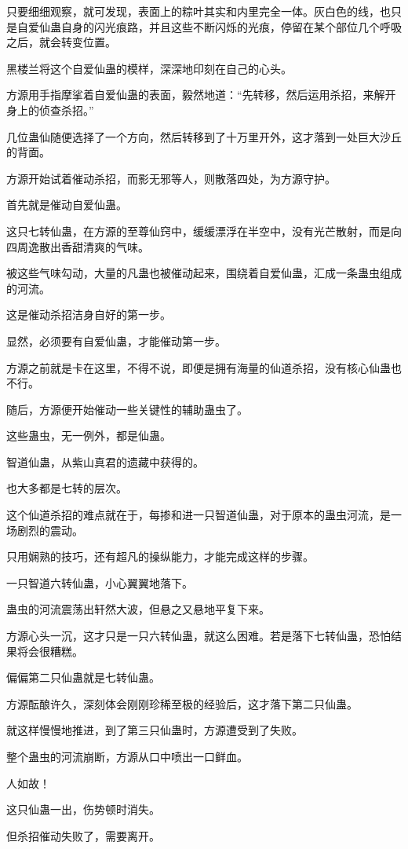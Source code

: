 \begin{this_body}
只要细细观察，就可发现，表面上的粽叶其实和内里完全一体。灰白色的线，也只是自爱仙蛊自身的闪光痕路，并且这些不断闪烁的光痕，停留在某个部位几个呼吸之后，就会转变位置。

黑楼兰将这个自爱仙蛊的模样，深深地印刻在自己的心头。

方源用手指摩挲着自爱仙蛊的表面，毅然地道：“先转移，然后运用杀招，来解开身上的侦查杀招。”

几位蛊仙随便选择了一个方向，然后转移到了十万里开外，这才落到一处巨大沙丘的背面。

方源开始试着催动杀招，而影无邪等人，则散落四处，为方源守护。

首先就是催动自爱仙蛊。

这只七转仙蛊，在方源的至尊仙窍中，缓缓漂浮在半空中，没有光芒散射，而是向四周逸散出香甜清爽的气味。

被这些气味勾动，大量的凡蛊也被催动起来，围绕着自爱仙蛊，汇成一条蛊虫组成的河流。

这是催动杀招洁身自好的第一步。

显然，必须要有自爱仙蛊，才能催动第一步。

方源之前就是卡在这里，不得不说，即便是拥有海量的仙道杀招，没有核心仙蛊也不行。

随后，方源便开始催动一些关键性的辅助蛊虫了。

这些蛊虫，无一例外，都是仙蛊。

智道仙蛊，从紫山真君的遗藏中获得的。

也大多都是七转的层次。

这个仙道杀招的难点就在于，每掺和进一只智道仙蛊，对于原本的蛊虫河流，是一场剧烈的震动。

只用娴熟的技巧，还有超凡的操纵能力，才能完成这样的步骤。

一只智道六转仙蛊，小心翼翼地落下。

蛊虫的河流震荡出轩然大波，但悬之又悬地平复下来。

方源心头一沉，这才只是一只六转仙蛊，就这么困难。若是落下七转仙蛊，恐怕结果将会很糟糕。

偏偏第二只仙蛊就是七转仙蛊。

方源酝酿许久，深刻体会刚刚珍稀至极的经验后，这才落下第二只仙蛊。

就这样慢慢地推进，到了第三只仙蛊时，方源遭受到了失败。

整个蛊虫的河流崩断，方源从口中喷出一口鲜血。

人如故！

这只仙蛊一出，伤势顿时消失。

但杀招催动失败了，需要离开。


\end{this_body}
